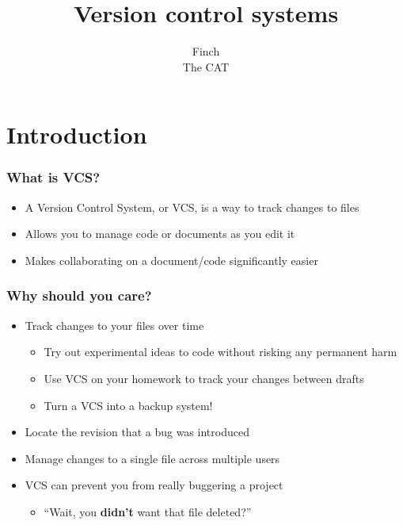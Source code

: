 \documentclass{beamer}
\title{Version control systems}
\author{Finch \\
    The CAT
}
\begin{document}
\begin{frame}
    \titlepage
\end{frame}

\section{Introduction}

\begin{frame}
    \frametitle{What is VCS?}
    \begin{itemize}
	\item A Version Control System, or VCS, is a way to track changes to files
	\item Allows you to manage code or documents as you edit it
	\item Makes collaborating on a document/code significantly easier
    \end{itemize}
\end{frame}

\begin{frame}
    \frametitle{Why should you care?}
    \begin{itemize}
	\item Track changes to your files over time
	\begin{itemize}
	    \item Try out experimental ideas to code without risking any permanent harm
	    \item Use VCS on your homework to track your changes between drafts
	    \item Turn a VCS into a backup system!
	\end{itemize}
	\item Locate the revision that a bug was introduced
	\item Manage changes to a single file across multiple users
	\item VCS can prevent you from really buggering a project
	\begin{itemize}
	    \item ``Wait, you {\bf didn't} want that file deleted?''
	\end{itemize}
    \end{itemize}
\end{frame}
\end{document}
